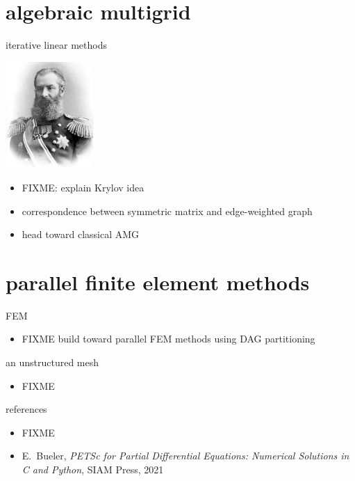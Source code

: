 \documentclass[10pt,hyperref,dvipsnames]{beamer}
\begin{document}
\section{algebraic multigrid}

\begin{frame}{iterative linear methods}

\hfill \includegraphics[width=0.25\textwidth]{figs/people/akrylov.jpg}

\vspace{-20mm}
\begin{itemize}
\item FIXME: explain Krylov idea
\item correspondence between symmetric matrix and edge-weighted graph
\item head toward classical AMG
\end{itemize}
\end{frame}


\section{parallel finite element methods}

\begin{frame}{FEM}

\begin{itemize}
\item FIXME build toward parallel FEM methods using DAG partitioning
\end{itemize}
\end{frame}

\begin{frame}{an unstructured mesh}

\begin{itemize}
\item FIXME
\begin{center}

\end{center}
\end{itemize}
\end{frame}


\begin{frame}{references}
\begin{itemize}
\item FIXME
\item E.~Bueler, \emph{PETSc for Partial Differential Equations: Numerical Solutions in C and Python}, SIAM Press, 2021
\end{itemize}
\end{frame}
\end{document}

